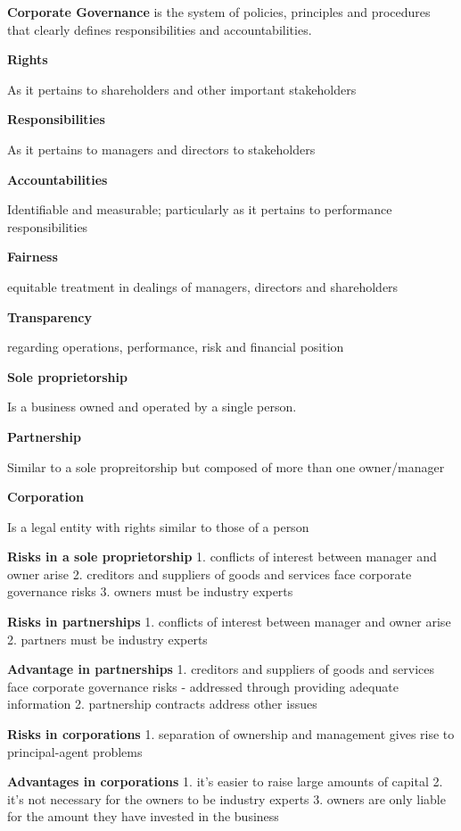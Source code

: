 \documentclass[12pt]{article}
\begin{document}
			\textbf{Corporate Governance} is the system of policies, principles and procedures that clearly defines responsibilities and accountabilities. 
			
			\textbf{Rights}
			
			As it pertains to shareholders and other important stakeholders
			
			\textbf{Responsibilities}
			
			As it pertains to managers and directors to stakeholders
			
			\textbf{Accountabilities}
			
			Identifiable and measurable; particularly as it pertains to performance responsibilities
			
			\textbf{Fairness}
			
			equitable treatment in dealings of managers, directors and shareholders
			
			\textbf{Transparency}
			
			regarding operations, performance, risk and financial position
			
			\textbf{Sole proprietorship}
			
			Is a business owned and operated by a single person.
			
			\textbf{Partnership}
			
			Similar to a sole propreitorship but composed of more than one owner/manager
			
			\textbf{Corporation}
			
			Is a legal entity with rights similar to those of a person
			
			\textbf{Risks in a sole proprietorship}
			1. conflicts of interest between manager and owner arise
			2. creditors and suppliers of goods and services face corporate governance risks
			3. owners must be industry experts
			
			\textbf{Risks in partnerships}
			1. conflicts of interest between manager and owner arise
			2. partners must be industry experts
			
			\textbf{Advantage in partnerships}
			1. creditors and suppliers of goods and services face corporate governance risks - addressed through providing adequate information
			2. partnership contracts address other issues
			
			\textbf{Risks in corporations}
			1. separation of ownership and management gives rise to principal-agent problems
			
			\textbf{Advantages in corporations}
			1. it's easier to raise large amounts of capital
			2. it's not necessary for the owners to be industry experts
			3. owners are only liable for the amount they have invested in the business
			
\end{document}
